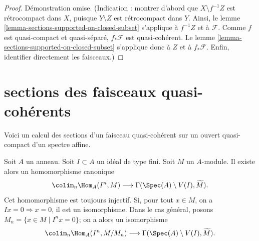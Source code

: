 \begin{proof}
Démonstration omise. (Indication : montrer d'abord que $X \setminus f^{-1}Z$ est rétrocompact
dans $X$, puisque $Y \setminus Z$ est rétrocompact dans $Y$. Ainsi,
le lemme \ref{lemma-sections-supported-on-closed-subset}
s'applique à $f^{-1}Z$ et à $\mathcal{F}$. Comme $f$ est
quasi-compact et quasi-séparé, $f_*\mathcal{F}$ est
quasi-cohérent. Le lemme \ref{lemma-sections-supported-on-closed-subset}
s'applique donc à $Z$ et à $f_*\mathcal{F}$. Enfin, identifier directement les
faisceaux.)
\end{proof}








\section{sections des faisceaux quasi-cohérents}
\label{section-sections-quasi-coherent}

\noindent
Voici un calcul des sections d'un faisceau quasi-cohérent sur un ouvert
quasi-compact d'un spectre affine.

\begin{lemma}
\label{lemma-sections-over-quasi-compact-open-in-affine}
Soit $A$ un anneau.
Soit $I \subset A$ un idéal de type fini.
Soit $M$ un $A$-module. Il
existe alors un homomorphisme canonique
$$
\colim_n \Hom_A(I^n, M)
\longrightarrow
\Gamma(\Spec(A) \setminus V(I), \widetilde{M}).
$$
Cet homomorphisme est toujours injectif.
Si, pour tout $x \in M$, on a $Ix = 0 \Rightarrow x = 0$,
il est un isomorphisme. Dans le cas général, posons
$M_n = \{x \in M \mid I^nx = 0\}$; on a alors un
isomorphisme
$$
\colim_n \Hom_A(I^n, M/M_n)
\longrightarrow
\Gamma(\Spec(A) \setminus V(I), \widetilde{M}).
$$
\end{lemma}

